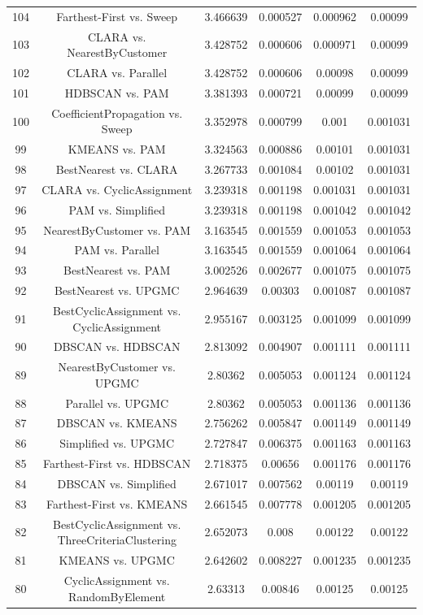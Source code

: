 \documentclass[a4paper,10pt]{article}
\begin{document}
\begin{landscape}
\begin{table}[!htp]
\begin{tabular}{cccccc}
104&Farthest-First vs. Sweep&3.466639&0.000527&0.000962&0.00099\\
103&CLARA vs. NearestByCustomer&3.428752&0.000606&0.000971&0.00099\\
102&CLARA vs. Parallel&3.428752&0.000606&0.00098&0.00099\\
101&HDBSCAN vs. PAM&3.381393&0.000721&0.00099&0.00099\\
100&CoefficientPropagation vs. Sweep&3.352978&0.000799&0.001&0.001031\\
99&KMEANS vs. PAM&3.324563&0.000886&0.00101&0.001031\\
98&BestNearest vs. CLARA&3.267733&0.001084&0.00102&0.001031\\
97&CLARA vs. CyclicAssignment&3.239318&0.001198&0.001031&0.001031\\
96&PAM vs. Simplified&3.239318&0.001198&0.001042&0.001042\\
95&NearestByCustomer vs. PAM&3.163545&0.001559&0.001053&0.001053\\
94&PAM vs. Parallel&3.163545&0.001559&0.001064&0.001064\\
93&BestNearest vs. PAM&3.002526&0.002677&0.001075&0.001075\\
92&BestNearest vs. UPGMC&2.964639&0.00303&0.001087&0.001087\\
91&BestCyclicAssignment vs. CyclicAssignment&2.955167&0.003125&0.001099&0.001099\\
90&DBSCAN vs. HDBSCAN&2.813092&0.004907&0.001111&0.001111\\
89&NearestByCustomer vs. UPGMC&2.80362&0.005053&0.001124&0.001124\\
88&Parallel vs. UPGMC&2.80362&0.005053&0.001136&0.001136\\
87&DBSCAN vs. KMEANS&2.756262&0.005847&0.001149&0.001149\\
86&Simplified vs. UPGMC&2.727847&0.006375&0.001163&0.001163\\
85&Farthest-First vs. HDBSCAN&2.718375&0.00656&0.001176&0.001176\\
84&DBSCAN vs. Simplified&2.671017&0.007562&0.00119&0.00119\\
83&Farthest-First vs. KMEANS&2.661545&0.007778&0.001205&0.001205\\
82&BestCyclicAssignment vs. ThreeCriteriaClustering&2.652073&0.008&0.00122&0.00122\\
81&KMEANS vs. UPGMC&2.642602&0.008227&0.001235&0.001235\\
80&CyclicAssignment vs. RandomByElement&2.63313&0.00846&0.00125&0.00125\\

\end{tabular}
\end{table}
\end{landscape}
\end{document}
